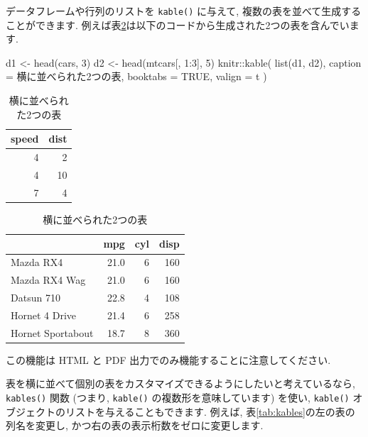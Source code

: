 \documentclass[
  11pt,
  lualatex,
  ja=standard]{bxjsreport}
\newenvironment{Shaded}{\begin{snugshade}}{\end{snugshade}}
\newcommand{\AttributeTok}[1]{\textcolor[rgb]{0.77,0.63,0.00}{#1}}
\newcommand{\ConstantTok}[1]{\textcolor[rgb]{0.00,0.00,0.00}{#1}}
\newcommand{\DecValTok}[1]{\textcolor[rgb]{0.00,0.00,0.81}{#1}}
\newcommand{\FunctionTok}[1]{\textcolor[rgb]{0.00,0.00,0.00}{#1}}
\newcommand{\NormalTok}[1]{#1}
\newcommand{\OtherTok}[1]{\textcolor[rgb]{0.56,0.35,0.01}{#1}}
\newcommand{\SpecialCharTok}[1]{\textcolor[rgb]{0.00,0.00,0.00}{#1}}
\newcommand{\StringTok}[1]{\textcolor[rgb]{0.31,0.60,0.02}{#1}}
\begin{document}
データフレームや行列のリストを \texttt{kable()} に与えて, 複数の表を並べて生成することができます. 例えば表\ref{tab:two-tables}は以下のコードから生成された2つの表を含んでいます.

\begin{Shaded}
\begin{Highlighting}[numbers=left,,]
\NormalTok{d1 }\OtherTok{\textless{}{-}} \FunctionTok{head}\NormalTok{(cars, }\DecValTok{3}\NormalTok{)}
\NormalTok{d2 }\OtherTok{\textless{}{-}} \FunctionTok{head}\NormalTok{(mtcars[, }\DecValTok{1}\SpecialCharTok{:}\DecValTok{3}\NormalTok{], }\DecValTok{5}\NormalTok{)}
\NormalTok{knitr}\SpecialCharTok{::}\FunctionTok{kable}\NormalTok{(}
  \FunctionTok{list}\NormalTok{(d1, d2),}
  \AttributeTok{caption =} \StringTok{\textquotesingle{}横に並べられた2つの表\textquotesingle{}}\NormalTok{,}
  \AttributeTok{booktabs =} \ConstantTok{TRUE}\NormalTok{, }\AttributeTok{valign =} \StringTok{\textquotesingle{}t\textquotesingle{}}
\NormalTok{)}
\end{Highlighting}
\end{Shaded}

\begin{table}
\caption{\label{tab:two-tables}横に並べられた2つの表}

\centering
\begin{tabular}[t]{rr}
\toprule
speed & dist\\
\midrule
4 & 2\\
4 & 10\\
7 & 4\\
\bottomrule
\end{tabular}
\centering
\begin{tabular}[t]{lrrr}
\toprule
  & mpg & cyl & disp\\
\midrule
Mazda RX4 & 21.0 & 6 & 160\\
Mazda RX4 Wag & 21.0 & 6 & 160\\
Datsun 710 & 22.8 & 4 & 108\\
Hornet 4 Drive & 21.4 & 6 & 258\\
Hornet Sportabout & 18.7 & 8 & 360\\
\bottomrule
\end{tabular}
\end{table}

この機能は HTML と PDF 出力でのみ機能することに注意してください.

表を横に並べて個別の表をカスタマイズできるようにしたいと考えているなら, \texttt{kables()} 関数 (つまり, \texttt{kable()} の複数形を意味しています) を使い, \texttt{kable()} オブジェクトのリストを与えることもできます. 例えば, 表\ref{tab:kables}の左の表の列名を変更し, かつ右の表の表示桁数をゼロに変更します.
\end{document}
